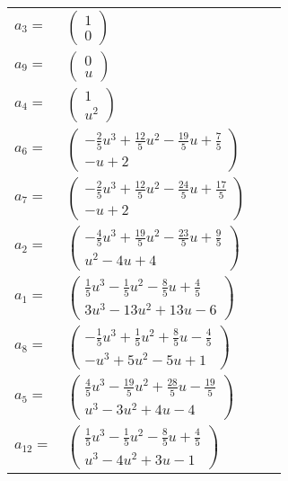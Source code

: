 \documentclass[1p]{elsarticle_modified}
\theoremstyle{definition}
\begin{document}
\begin{tabular}{m{7pt} m{180pt} m{7pt} m{180pt} }
\flushright $a_{3}=$&$\begin{pmatrix}1\\0\end{pmatrix}$ \\
\flushright $a_{9}=$&$\begin{pmatrix}0\\u\end{pmatrix}$ \\
\flushright $a_{4}=$&$\begin{pmatrix}1\\u^2\end{pmatrix}$ \\
\flushright $a_{6}=$&$\begin{pmatrix}-\frac{2}{5} u^3+\frac{12}{5} u^2-\frac{19}{5} u+\frac{7}{5}\\- u+2\end{pmatrix}$ \\
\flushright $a_{7}=$&$\begin{pmatrix}-\frac{2}{5} u^3+\frac{12}{5} u^2-\frac{24}{5} u+\frac{17}{5}\\- u+2\end{pmatrix}$ \\
\flushright $a_{2}=$&$\begin{pmatrix}-\frac{4}{5} u^3+\frac{19}{5} u^2-\frac{23}{5} u+\frac{9}{5}\\u^2-4 u+4\end{pmatrix}$ \\
\flushright $a_{1}=$&$\begin{pmatrix}\frac{1}{5} u^3-\frac{1}{5} u^2-\frac{8}{5} u+\frac{4}{5}\\3 u^3-13 u^2+13 u-6\end{pmatrix}$ \\
\flushright $a_{8}=$&$\begin{pmatrix}-\frac{1}{5} u^3+\frac{1}{5} u^2+\frac{8}{5} u-\frac{4}{5}\\- u^3+5 u^2-5 u+1\end{pmatrix}$ \\
\flushright $a_{5}=$&$\begin{pmatrix}\frac{4}{5} u^3-\frac{19}{5} u^2+\frac{28}{5} u-\frac{19}{5}\\u^3-3 u^2+4 u-4\end{pmatrix}$ \\
\flushright $a_{12}=$&$\begin{pmatrix}\frac{1}{5} u^3-\frac{1}{5} u^2-\frac{8}{5} u+\frac{4}{5}\\u^3-4 u^2+3 u-1\end{pmatrix}$ \\

\end{tabular}
\end{document}
